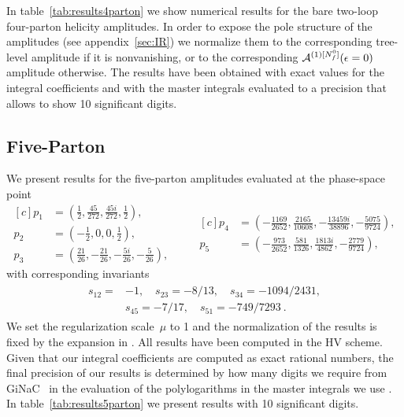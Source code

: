 In table~\ref{tab:results4parton} we show numerical results for
the bare two-loop four-parton helicity amplitudes.
In order to expose the pole structure of the amplitudes (see
appendix~\ref{sec:IR}) we normalize them to
the corresponding tree-level amplitude if
it is nonvanishing, or to the corresponding $\mathcal{A}^{(1)[N_f^0]}(\epsilon=0)$ amplitude otherwise.
The results have been obtained with exact values for the 
integral coefficients and with the master integrals 
evaluated to a precision that allows to show 10
significant digits.




\subsection{Five-Parton}
\label{sec:fivepartonRes}
We present results for the five-parton amplitudes evaluated at
the phase-space point
\begin{equation}
  \begin{aligned}[c]
    p_1 &= \left( \frac{1}{2}, \frac{45}{272}, \frac{45 i}{272}, \frac{1}{2} \right), \\
    p_2 &= \left( -\frac{1}{2}, 0, 0, \frac{1}{2} \right), \\
    p_3 &= \left( \frac{21}{26}, -\frac{21}{26}, -\frac{5 i}{26}, -\frac{5}{26} \right),
  \end{aligned}
  \qquad
  \begin{aligned}[c]
    p_4 &= \left( -\frac{1169}{2652}, \frac{2165}{10608}, -\frac{13459 i}{38896}, -\frac{5075}{9724} \right),\\[3ex]
    p_5 &= \left( -\frac{973}{2652}, \frac{581}{1326}, \frac{1813 i}{4862}, -\frac{2779}{9724} \right),
  \end{aligned}
  \label{eq:EvalPoint5}
\end{equation}
with corresponding invariants
\begin{align}\begin{split}
  s_{12} =& -1, \quad s_{23} = -8/13, \quad s_{34} = -1094/2431,\\
  &s_{45} = -7/17, \quad s_{51} = -749/7293\ .
\label{eq:Invs5pt}
\end{split}\end{align}
We set the regularization scale~$\mu$ to 1 and the normalization
of the results is fixed by the expansion in 
. All results have been computed in the 
HV scheme. Given that our integral coefficients are computed as 
exact rational numbers, the final precision of our results is 
determined by how many digits we require from 
GiNaC~\cite{Vollinga:2004sn}
in the evaluation of the polylogarithms in the master integrals
we use \cite{Papadopoulos:2015jft,Gehrmann:2000zt}. In
table~\ref{tab:results5parton} we present results with 10
significant digits.

